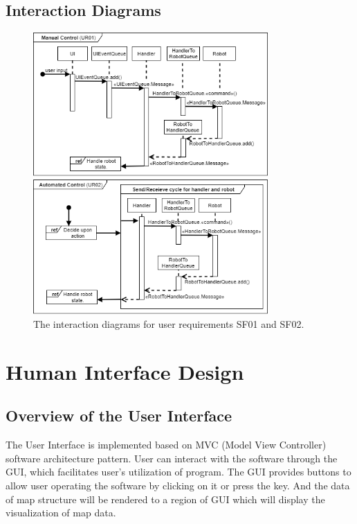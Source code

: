\documentclass[12pt,a4paper]{article}
\begin{document}
\subsection{Interaction Diagrams}
\begin{figure}[H]
	\caption{The interaction diagrams for user requirements SF01 and SF02.}
	\centering
		\includegraphics[width=0.8\textwidth]{Interactions.png}
\end{figure}
\newpage
\section{Human Interface Design}
\subsection{Overview of the User Interface}
The User Interface is implemented based on MVC (Model View Controller) software architecture pattern.  User can interact with the software through the GUI, which facilitates user’s utilization of program. The GUI provides buttons to allow user operating the software by clicking on it or press the key. And the data of map structure will be rendered to a region of GUI which will display the visualization of map data.\\
\end{document}
